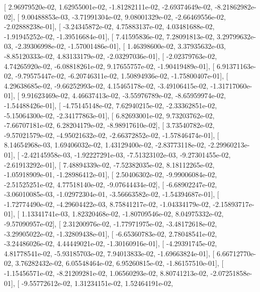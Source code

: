 \documentclass{article}
\begin{document}
       [  2.96979520e-02,   1.62955001e-02,  -1.81282111e-02,
         -2.69374649e-02,  -8.21862982e-02],
       [  9.00488853e-03,  -3.71991304e-02,   9.08001329e-02,
         -2.66469556e-02,  -2.02888238e-01],
       [ -3.24345872e-02,   4.75883137e-02,   4.03481688e-02,
         -1.91945252e-02,  -1.39516684e-01],
       [  7.41595836e-02,   7.28091813e-02,   3.29799632e-03,
         -2.39306998e-02,  -1.57001486e-01],
       [  1.46398600e-02,   3.37935632e-03,  -8.85120333e-02,
          4.83133179e-02,  -2.03297036e-01],
       [ -2.02379763e-02,   4.74265920e-02,  -6.08818261e-02,
          9.17655757e-02,  -1.90419489e-01],
       [  6.91371163e-02,  -9.79575447e-02,  -6.20746311e-02,
          1.50894936e-02,  -1.75800407e-01],
       [  4.29638685e-02,  -9.66252993e-02,   4.15465178e-02,
         -3.49106415e-02,  -1.31717060e-01],
       [  9.91623469e-02,   4.46637413e-02,  -3.55976789e-02,
         -8.65959974e-02,  -1.54488426e-01],
       [ -4.75145148e-02,   7.62940215e-02,  -2.33362851e-02,
         -5.15064300e-02,  -2.34177863e-01],
       [  6.82693001e-02,   9.73203762e-02,  -7.66707181e-02,
          6.28204179e-02,  -8.98917610e-02],
       [  3.73540782e-02,  -9.57021579e-02,  -4.95021632e-02,
         -2.66372852e-02,  -1.57846474e-01],
       [  8.14654968e-03,   1.69406032e-02,   1.43129400e-02,
         -2.83773118e-02,  -2.29960213e-01],
       [ -2.42145958e-03,  -1.92227291e-03,  -7.51323102e-03,
         -9.27301455e-02,  -2.61913292e-01],
       [  7.48894339e-02,  -7.52382035e-02,   8.18112265e-02,
         -1.05918909e-01,  -1.28986412e-01],
       [  2.50406302e-02,  -9.99006084e-02,  -2.51525251e-02,
          4.77518140e-02,  -9.07644434e-02],
       [ -6.68902247e-02,  -3.06010085e-03,  -1.02972304e-01,
         -3.56663582e-02,  -1.54394687e-01],
       [ -1.72774490e-02,  -4.29604422e-03,   8.75841217e-02,
         -1.04334179e-02,  -2.15893717e-01],
       [  1.13341741e-03,   1.82320468e-02,  -1.80709546e-02,
          8.04975332e-02,  -9.57090957e-02],
       [  2.31200976e-02,  -1.77971975e-02,  -3.48172618e-02,
         -3.29905022e-02,  -1.32809438e-01],
       [ -6.65360783e-02,   2.78048541e-02,  -3.24486026e-02,
          4.44449021e-02,  -1.30160916e-01],
       [ -4.29391745e-02,   4.81778541e-02,  -5.93185703e-02,
          7.94013833e-02,  -1.69663824e-01],
       [  6.66712770e-02,   3.76282432e-02,   6.05548464e-02,
          6.95260815e-02,  -1.86157510e-01],
       [ -1.15456571e-02,  -8.21209281e-02,   1.06560293e-02,
          8.80741213e-02,  -2.07251858e-01],
       [ -9.55772612e-02,   1.31234151e-02,   1.52464191e-02,
\end{document}
